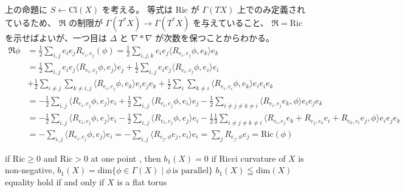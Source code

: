 \begin{Proof}
\itemprof
  上の命題に \(S \leftarrow \text{Cl}(X)\) を考える。
  等式は \(\text{Ric}\) が \(\Gamma(TX)\) 上でのみ定義されているため、 \(\mathfrak{R}\) の制限が \(\Gamma(T^*X) \to \Gamma(T^*X)\) を与えていること、 \(\mathfrak{R} = \text{Ric}\) を示せばよいが、一つ目は \(\Delta\) と \(\nabla * \nabla\) が次数を保つことからわかる。
  \begin{align*}
    \mathfrak{R} \phi
    &= \frac{1}{2} \sum_{i,j} e_i e_j R_{e_i , e_j}(\phi)
     = \frac{1}{2} \sum_{i,j,k} e_i e_j \langle R_{e_i , e_j} \phi , e_k \rangle e_k \\
    &= \frac{1}{2} \sum_{i,j} e_i e_j \langle R_{e_i , e_j} \phi , e_j \rangle e_j
    + \frac{1}{2} \sum_{i,j} e_i e_j \langle R_{e_i , e_j} \phi , e_i \rangle e_i \\
    &+ \frac{1}{2} \sum_{i \not = j} \sum_{k \not = i,j} \langle R_{e_i , e_j} \phi , e_k \rangle e_i e_j e_k + \frac{1}{2} \sum_{i} \sum_{k \not = i} \langle R_{e_i , e_i} \phi , e_k \rangle e_i e_i e_k \\
    &= - \frac{1}{2} \sum_{i,j} \langle R_{e_i , e_j} \phi , e_j \rangle e_i
    + \frac{1}{2} \sum_{i,j} \langle R_{e_i , e_j} \phi , e_i \rangle e_j
    - \frac{1}{2} \sum_{i \not = j \not = k \not = i} \langle R_{e_i , e_j} e_k , \phi \rangle e_i e_j e_k \\
    &= - \frac{1}{2} \sum_{i,j} \langle R_{e_i , e_j} \phi , e_j \rangle e_i
    - \frac{1}{2} \sum_{i,j} \langle R_{e_i , e_j} \phi , e_j \rangle e_i
    - \frac{1}{2} \frac{1}{3} \sum_{i \not = j \not = k \not = i} \langle R_{e_i , e_j} e_k + R_{e_j , e_k} e_i + R_{e_k , e_i} e_j , \phi \rangle e_i e_j e_k \\
    &= - \sum_{i,j} \langle R_{e_i , e_j} \phi , e_j \rangle e_i = - \sum_{i,j} \langle R_{e_j , \phi} e_j , e_i \rangle e_i = \sum_j R_{e_j , \phi} e_j = \text{Ric}(\phi)
  \end{align*}
\end{Proof}

\begin{Theorem}
\itemprop
  if \(\text{Ric} \geq 0\) and \(\text{Ric} > 0\) at one point , then \(b_1(X) = 0\)
\itemprop
  if Ricci curvature of \(X\) is non-negative, \(b_1(X) = \text{dim}\{\phi \in \Gamma(X) \mid \phi \, \text{is parallel}\}\)
\itemprop
  \(b_1(X) \leqq \text{dim}(X)\)
\itemprop
  equality hold if and only if \(X\) is a flat torus
\end{Theorem}

